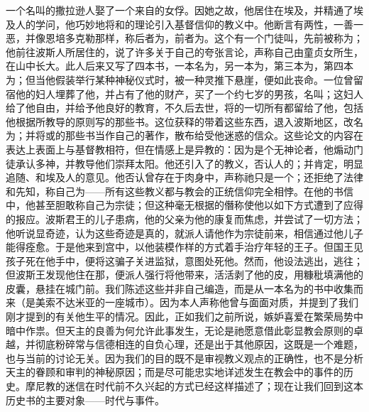 一个名叫的撒拉逊人娶了一个来自的女俘。因她之故，他居住在埃及，并精通了埃及人的学问，他巧妙地将和的理论引入基督信仰的教义中。他断言有两性，一善一恶，并像恩培多克勒那样，称后者为，前者为。这个有一个门徒叫，先前被称为；他前往波斯人所居住的，说了许多关于自己的夸张言论，声称自己由童贞女所生，在山中长大。此人后来又写了四本书，一本名为，另一本为，第三本为，第四本为；但当他假装举行某种神秘仪式时，被一种灵推下悬崖，便如此丧命。一位曾留宿他的妇人埋葬了他，并占有了他的财产，买了一个约七岁的男孩，名叫；这妇人给了他自由，并给予他良好的教育，不久后去世，将的一切所有都留给了他，包括他根据所教导的原则写的那些书。这位获释的带着这些东西，退入波斯地区，改名为；并将或的那些书当作自己的著作，散布给受他迷惑的信众。这些论文的内容在表达上表面上与基督教相符，但在情感上是异教的：因为是个无神论者，他煽动门徒承认多神，并教导他们崇拜太阳。他还引入了的教义，否认人的；并肯定，明显追随、和埃及人的意见。他否认曾存在于肉身中，声称祂只是一个；还拒绝了法律和先知，称自己为——所有这些教义都与教会的正统信仰完全相悖。在他的书信中，他甚至胆敢称自己为宗徒；但这种毫无根据的僭称使他以如下方式遭到了应得的报应。波斯君王的儿子患病，他的父亲为他的康复而焦虑，并尝试了一切方法；他听说显奇迹，认为这些奇迹是真的，就派人请他作为宗徒前来，相信通过他儿子能得痊愈。于是他来到宫中，以他装模作样的方式着手治疗年轻的王子。但国王见孩子死在他手中，便将这骗子关进监狱，意图处死他。然而，他设法逃出，逃往；但波斯王发现他住在那，便派人强行将他带来，活活剥了他的皮，用糠秕填满他的皮囊，悬挂在城门前。我们陈述这些并非自己编造，而是从一本名为的书中收集而来（是美索不达米亚的一座城市）。因为本人声称他曾与面面对质，并提到了我们刚才提到的有关他生平的情况。因此，正如我们之前所说，嫉妒喜爱在繁荣局势中暗中作祟。但天主的良善为何允许此事发生，无论是祂愿意借此彰显教会原则的卓越，并彻底粉碎常与信德相连的自负心理，还是出于其他原因，这既是一个难题，也与当前的讨论无关。因为我们的目的既不是审视教义观点的正确性，也不是分析天主的眷顾和审判的神秘原因；而是尽可能忠实地详述发生在教会中的事件的历史。摩尼教的迷信在时代前不久兴起的方式已经这样描述了；现在让我们回到这本历史书的主要对象——时代与事件。\par

